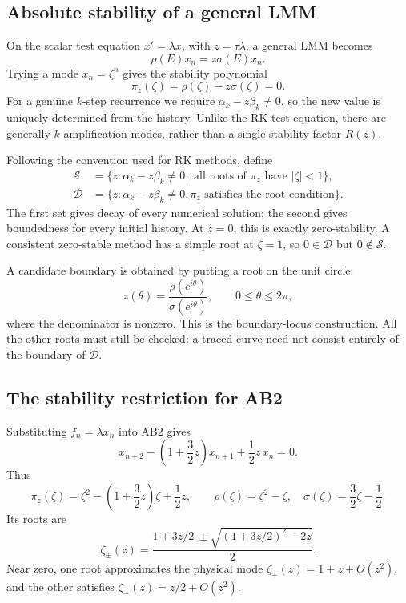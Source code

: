 \subsection{Absolute stability of a general LMM}

On the scalar test equation \(x'=\lambda x\), with
\(z=\tau\lambda\), a general LMM becomes
\[
 \rho(E)x_n=z\sigma(E)x_n.
\]
Trying a mode \(x_n=\zeta^n\) gives the stability polynomial
\begin{equation}\label{eq:lmm-stability-polynomial-oct-09}
 \boxed{\pi_z(\zeta)=\rho(\zeta)-z\sigma(\zeta)=0.}
\end{equation}
For a genuine \(k\)-step recurrence we require
\(\alpha_k-z\beta_k\neq0\), so the new value is uniquely
determined from the history. Unlike the RK test equation, there
are generally \(k\) amplification modes, rather than a single
stability factor \(R(z)\).

Following the convention used for RK methods, define
\begin{align*}
 \mathcal S&=\{z:\alpha_k-z\beta_k\neq0,
              \text{ all roots of }\pi_z\text{ have }|\zeta|<1\},\\
 \mathcal D&=\{z:\alpha_k-z\beta_k\neq0,
              \pi_z\text{ satisfies the root condition}\}.
\end{align*}
The first set gives decay of every numerical solution; the second
gives boundedness for every initial history. At \(z=0\), this is
exactly zero-stability. A consistent zero-stable method has a simple
root at \(\zeta=1\), so \(0\in\mathcal D\) but
\(0\notin\mathcal S\).

A candidate boundary is obtained by putting a root on the unit
circle:
\begin{equation}\label{eq:lmm-boundary-oct-09}
 z(\theta)=\frac{\rho(e^{i\theta})}{\sigma(e^{i\theta})},
 \qquad 0\leq\theta\leq2\pi,
\end{equation}
where the denominator is nonzero. This is the boundary-locus
construction. All the other roots must still be checked: a traced
curve need not consist entirely of the boundary of \(\mathcal D\).

\subsection{The stability restriction for AB2}

Substituting \(f_n=\lambda x_n\) into AB2 gives
\[
 x_{n+2}-\left(1+\frac32z\right)x_{n+1}
                   +\frac12z\,x_n=0.
\]
Thus
\begin{equation}\label{eq:ab2-stability-oct-09}
 \pi_z(\zeta)=\zeta^2-\left(1+\frac32z\right)\zeta+\frac12z,
 \qquad
 \rho(\zeta)=\zeta^2-\zeta,\quad
 \sigma(\zeta)=\frac32\zeta-\frac12.
\end{equation}
Its roots are
\[
 \zeta_\pm(z)=\frac{1+3z/2
              \ \pm\sqrt{(1+3z/2)^2-2z}}2.
\]
Near zero, one root approximates the physical mode
\(\zeta_+(z)=1+z+O(z^2)\), and the other satisfies
\(\zeta_-(z)=z/2+O(z^2)\).

